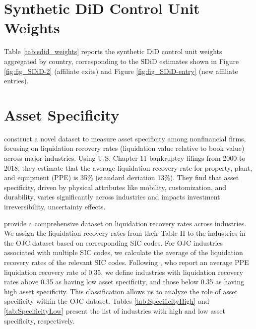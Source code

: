 \documentclass[preprint,11pt,authoryear]{elsarticle}
\begin{document}
\clearpage
\section{Synthetic DiD Control Unit Weights}\label{sec:sdid_weights}

Table \ref{tab:sdid_weights} reports the synthetic DiD control unit weights aggregated by country, corresponding to the SDiD estimates shown in Figure \ref{fig:fig_SDiD-2} (affiliate exits) and Figure \ref{fig:fig_SDiD-entry} (new affiliate entries).


{\renewcommand\normalsize{\scriptsize}%
\normalsize 

}




\clearpage
\section{Asset Specificity}\label{sec:asset}

\cite{kermani2023asset} construct a novel dataset to measure asset specificity among nonfinancial firms, focusing on liquidation recovery rates (liquidation value relative to book value) across major industries. Using U.S. Chapter 11 bankruptcy filings from 2000 to 2018, they estimate that the average liquidation recovery rate for property, plant, and equipment (PPE) is 35\% (standard deviation 13\%).
They find that asset specificity, driven by physical attributes like mobility, customization, and durability, varies significantly across industries and impacts investment irreversibility, uncertainty effects.

\cite{kermani2023asset} provide a comprehensive dataset on liquidation recovery rates across industries. 
We assign the liquidation recovery rates from their Table II to the industries in the OJC dataset based on corresponding SIC codes. For OJC industries associated with multiple SIC codes, we calculate the average of the liquidation recovery rates of the relevant SIC codes. Following \cite{kermani2023asset}, who report an average PPE liquidation recovery rate of 0.35, we define industries with liquidation recovery rates above 0.35 as having low asset specificity, and those below 0.35 as having high asset specificity. This classification allows us to analyze the role of asset specificity within the OJC dataset.
Tables \ref{tab:SpecificityHigh} and \ref{tab:SpecificityLow} present the list of industries with high and low asset specificity, respectively.




{\renewcommand\normalsize{\scriptsize}%
\normalsize 

}


{\renewcommand\normalsize{\scriptsize}%
\normalsize 

}
\end{document}
